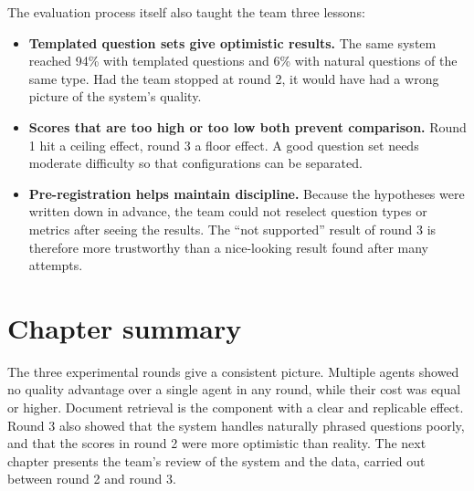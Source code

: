The evaluation process itself also taught the team three lessons:

\begin{itemize}
    \item \textbf{Templated question sets give optimistic results.} The same system reached 94\% with templated questions and 6\% with natural questions of the same type. Had the team stopped at round 2, it would have had a wrong picture of the system's quality.
    \item \textbf{Scores that are too high or too low both prevent comparison.} Round 1 hit a ceiling effect, round 3 a floor effect. A good question set needs moderate difficulty so that configurations can be separated.
    \item \textbf{Pre-registration helps maintain discipline.} Because the hypotheses were written down in advance, the team could not reselect question types or metrics after seeing the results. The ``not supported'' result of round 3 is therefore more trustworthy than a nice-looking result found after many attempts.
\end{itemize}

\section{Chapter summary}

The three experimental rounds give a consistent picture. Multiple agents showed no quality advantage over a single agent in any round, while their cost was equal or higher. Document retrieval is the component with a clear and replicable effect. Round 3 also showed that the system handles naturally phrased questions poorly, and that the scores in round 2 were more optimistic than reality. The next chapter presents the team's review of the system and the data, carried out between round 2 and round 3.
